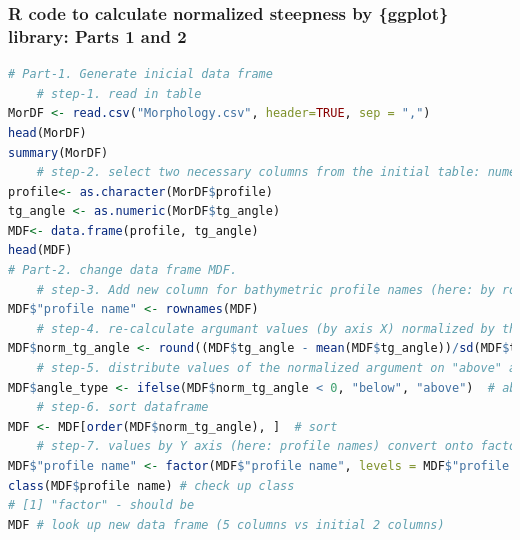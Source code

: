 \documentclass[pdflatex,compress,10pt,
	xcolor={dvipsnames,dvipsnames,svgnames,x11names,table},
	hyperref={colorlinks = true,breaklinks = true, urlcolor = NavyBlue, breaklinks = true}]{beamer}
\begin{document}
\begin{frame}[fragile,shrink=10]\frametitle{R code to calculate normalized steepness by \{ggplot\} library: Parts 1 and 2}
\begin{lstlisting}[language=R]
# Part-1. Generate inicial data frame 
	# step-1. read in table
MorDF <- read.csv("Morphology.csv", header=TRUE, sep = ",")
head(MorDF)
summary(MorDF)
	# step-2. select two necessary columns from the initial table: numeric and symbol values. Generate from the them a new MDF data frame.
profile<- as.character(MorDF$profile)
tg_angle <- as.numeric(MorDF$tg_angle)
MDF<- data.frame(profile, tg_angle)
head(MDF)
# Part-2. change data frame MDF. 
	# step-3. Add new column for bathymetric profile names (here: by rows 1:25)
MDF$"profile name" <- rownames(MDF)  
	# step-4. re-calculate argumant values (by axis X) normalized by the difference between mean and standard deviation)
MDF$norm_tg_angle <- round((MDF$tg_angle - mean(MDF$tg_angle))/sd(MDF$tg_angle), 2)  # compute normalized tg_angle
	# step-5. distribute values of the normalized argument on "above" and "below" mean
MDF$angle_type <- ifelse(MDF$norm_tg_angle < 0, "below", "above")  # above / below avg flag	
	# step-6. sort dataframe
MDF <- MDF[order(MDF$norm_tg_angle), ]  # sort
	# step-7. values by Y axis (here: profile names) convert onto factor 
MDF$"profile name" <- factor(MDF$"profile name", levels = MDF$"profile name")  # convert to factor to retain sorted order in plot.
class(MDF$profile name) # check up class 
# [1] "factor" - should be
MDF # look up new data frame (5 columns vs initial 2 columns)
\end{lstlisting}
\end{frame}
\end{document}

